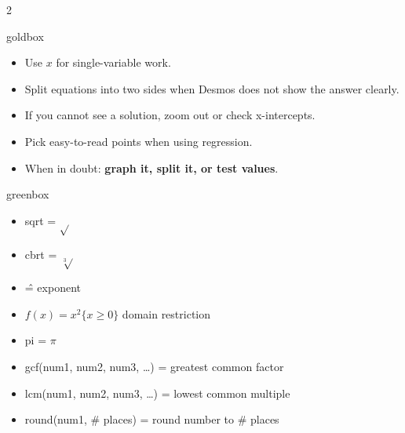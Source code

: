 \documentclass[14pt]{article}
\begin{document}
    \begin{multicols}{2}
        \begin{skillbox}{goldbox}
            \begin{itemize}
                \item Use \textbf{$x$} for single-variable work.
                \item Split equations into two sides when Desmos does not show the answer clearly.
                \item If you cannot see a solution, zoom out or check x-intercepts.
                \item Pick easy-to-read points when using regression.
                \item When in doubt: \textbf{graph it, split it, or test values}.
            \end{itemize}
        \end{skillbox}
\columnbreak
    \begin{skillbox}{greenbox}
        \begin{itemize}
            \item sqrt = $\sqrt{}$
            \item cbrt = $\sqrt[3]{}$
            \item \^ = exponent
            \item $f(x) = x^2 \{x \ge 0\}$ domain restriction
            \item pi = $\pi$
            \item gcf(num1, num2, num3, \ldots) = greatest common factor
            \item lcm(num1, num2, num3, \ldots) = lowest common multiple
            \item round(num1, \# places) = round number to \# places
        \end{itemize}
    \end{skillbox}
    \end{multicols}

    
\end{document}
